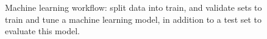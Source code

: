 \begin{figure}[htb]
	\begin{center}
		\caption[Machine learning workflow]{Machine learning workflow: split data into train, and validate sets to train and tune a machine learning model, in addition to a test set to evaluate this model.}
		\label{fig:ml1}
	\end{center}
\end{figure}

